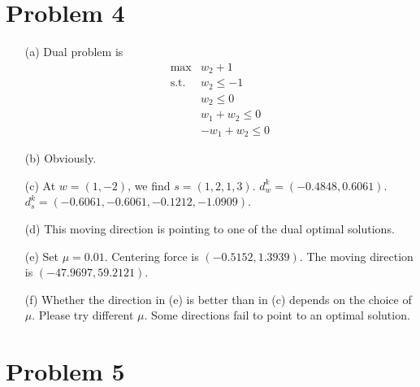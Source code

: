\documentclass[12pt]{article}
\begin{document}
\section*{Problem 4}

\begin{itemize}
  \item[(a)] Dual problem is
  \begin{equation*}
    \begin{array}{rl}
      \max & w_2+1 \\
      \text{s.t.} & w_2\leq -1 \\
      & w_2 \leq 0 \\
      & w_1+w_2\leq 0 \\
      & -w_1+w_2\leq 0
    \end{array}
  \end{equation*}
  \item[(b)] Obviously.
  \item[(c)] At $w=(1,-2)$, we find $s=(1,2,1,3)$. $d^k_w=(-0.4848,0.6061)$. $d^k_s=(-0.6061,-0.6061,-0.1212,-1.0909)$.
  \item[(d)] This moving direction is pointing to one of the dual optimal solutions.
  \item[(e)] Set $\mu=0.01$. Centering force is $(-0.5152,1.3939)$. The moving direction is $(-47.9697,59.2121)$.
  \item[(f)] Whether the direction in (e) is better than in (c) depends on the choice of $\mu$. Please try different $\mu$. Some directions fail to point to an optimal solution.
\end{itemize}



\section*{Problem 5}
\end{document}
